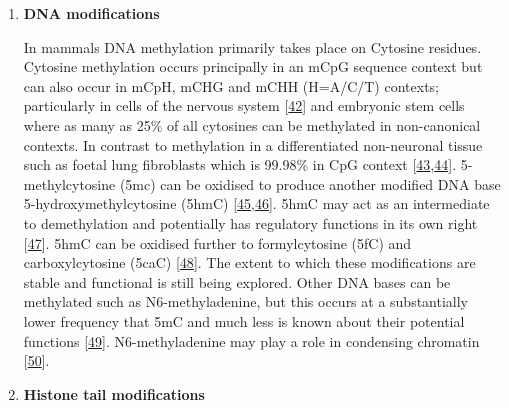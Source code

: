 \documentclass[
]{book}
\begin{document}
\begin{enumerate}
\def\labelenumi{\arabic{enumi}.}
\item
  \textbf{DNA modifications}

  In mammals DNA methylation primarily takes place on Cytosine residues.
  Cytosine methylation occurs principally in an mCpG sequence context but can also occur in mCpH, mCHG and mCHH (H=A/C/T) contexts; particularly in cells of the nervous system {[}\protect\hyperlink{ref-Guo2014a}{42}{]} and embryonic stem cells where as many as 25\% of all cytosines can be methylated in non-canonical contexts.
  In contrast to methylation in a differentiated non-neuronal tissue such as foetal lung fibroblasts which is 99.98\% in CpG context {[}\protect\hyperlink{ref-Lister2009}{43},\protect\hyperlink{ref-Schultz2015}{44}{]}.
  5-methylcytosine (5mc) can be oxidised to produce another modified DNA base 5-hydroxymethylcytosine (5hmC) {[}\protect\hyperlink{ref-Penn1972}{45},\protect\hyperlink{ref-Kriaucionis2009}{46}{]}.
  5hmC may act as an intermediate to demethylation and potentially has regulatory functions in its own right {[}\protect\hyperlink{ref-Pfeifer2013}{47}{]}.
  5hmC can be oxidised further to formylcytosine (5fC) and carboxylcytosine (5caC) {[}\protect\hyperlink{ref-Ito2011}{48}{]}.
  The extent to which these modifications are stable and functional is still being explored.
  Other DNA bases can be methylated such as N6-methyladenine, but this occurs at a substantially lower frequency that 5mC and much less is known about their potential functions {[}\protect\hyperlink{ref-Wu2016}{49}{]}.
  N6-methyladenine may play a role in condensing chromatin {[}\protect\hyperlink{ref-Xie2018}{50}{]}.
\item
  \textbf{Histone tail modifications}


\end{enumerate}
\end{document}
